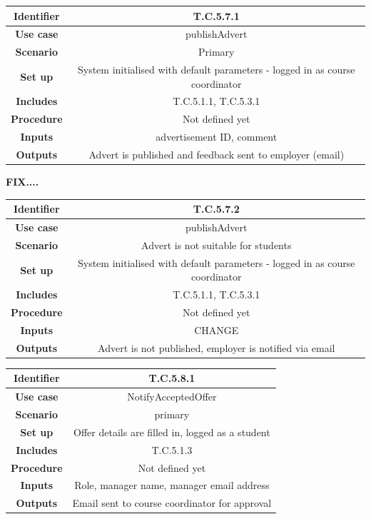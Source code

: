 \documentclass{l3deliverable}
\begin{document}
\begin{tabular}{|c|c|}
\hline \textbf{Identifier} & T.C.5.7.1\\
\hline \textbf{Use case} & publishAdvert\\
\hline \textbf{Scenario} & Primary\\
\hline \textbf{Set up} & System initialised with default parameters - logged in as course coordinator\\
\hline \textbf{Includes} & T.C.5.1.1, T.C.5.3.1\\
\hline \textbf{Procedure} & Not defined yet\\
\hline \textbf{Inputs} & advertisement ID, comment\\
\hline \textbf{Outputs} & Advert is published and feedback sent to employer (email)\\
\hline
\end{tabular}

\textbf{FIX....}
\begin{tabular}{|c|c|}
\hline \textbf{Identifier} & T.C.5.7.2\\
\hline \textbf{Use case} & publishAdvert\\
\hline \textbf{Scenario} & Advert is not suitable for students\\
\hline \textbf{Set up} & System initialised with default parameters - logged in as course coordinator\\
\hline \textbf{Includes} & T.C.5.1.1, T.C.5.3.1\\
\hline \textbf{Procedure} & Not defined yet\\
\hline \textbf{Inputs} & CHANGE\\
\hline \textbf{Outputs} & Advert is not published, employer is notified via email\\
\hline
\end{tabular}

\begin{tabular}{|c|c|}
\hline \textbf{Identifier} & T.C.5.8.1\\
\hline \textbf{Use case} & NotifyAcceptedOffer\\
\hline \textbf{Scenario} & primary\\
\hline \textbf{Set up} & Offer details are filled in, logged as a student\\
\hline \textbf{Includes} & T.C.5.1.3\\
\hline \textbf{Procedure} & Not defined yet\\
\hline \textbf{Inputs} & Role, manager name, manager email address\\
\hline \textbf{Outputs} & Email sent to course coordinator for approval\\
\hline
\end{tabular}
\end{document}
